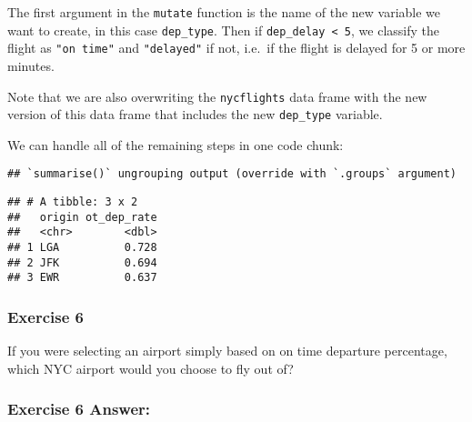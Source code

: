 \documentclass[
]{article}
\newenvironment{Shaded}{\begin{snugshade}}{\end{snugshade}}
\newcommand{\DataTypeTok}[1]{\textcolor[rgb]{0.13,0.29,0.53}{#1}}
\newcommand{\KeywordTok}[1]{\textcolor[rgb]{0.13,0.29,0.53}{\textbf{#1}}}
\newcommand{\NormalTok}[1]{#1}
\newcommand{\OperatorTok}[1]{\textcolor[rgb]{0.81,0.36,0.00}{\textbf{#1}}}
\newcommand{\StringTok}[1]{\textcolor[rgb]{0.31,0.60,0.02}{#1}}
\begin{document}
The first argument in the \texttt{mutate} function is the name of the
new variable we want to create, in this case \texttt{dep\_type}. Then if
\texttt{dep\_delay\ \textless{}\ 5}, we classify the flight as
\texttt{"on\ time"} and \texttt{"delayed"} if not, i.e.~if the flight is
delayed for 5 or more minutes.

Note that we are also overwriting the \texttt{nycflights} data frame
with the new version of this data frame that includes the new
\texttt{dep\_type} variable.

We can handle all of the remaining steps in one code chunk:

\begin{Shaded}
\end{Shaded}

\begin{verbatim}
## `summarise()` ungrouping output (override with `.groups` argument)
\end{verbatim}

\begin{verbatim}
## # A tibble: 3 x 2
##   origin ot_dep_rate
##   <chr>        <dbl>
## 1 LGA          0.728
## 2 JFK          0.694
## 3 EWR          0.637
\end{verbatim}

\hypertarget{exercise-6}{%
\subsubsection{Exercise 6}\label{exercise-6}}

If you were selecting an airport simply based on on time departure
percentage, which NYC airport would you choose to fly out of?

\hypertarget{exercise-6-answer}{%
\subsubsection{\texorpdfstring{\textbf{Exercise 6
Answer:}}{Exercise 6 Answer:}}\label{exercise-6-answer}}
\end{document}
